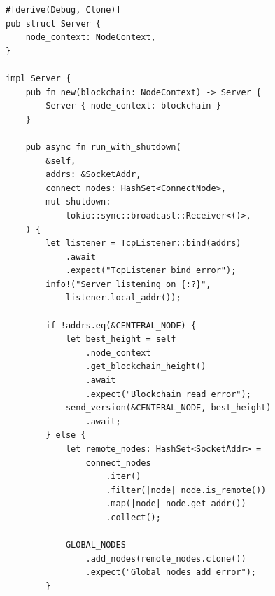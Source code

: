 \begin{listing}[htbp]
\caption{TCP server setup and bootstrap}
\label{lst:ch12-server-setup}
\begin{verbatim}
#[derive(Debug, Clone)]
pub struct Server {
    node_context: NodeContext,
}

impl Server {
    pub fn new(blockchain: NodeContext) -> Server {
        Server { node_context: blockchain }
    }

    pub async fn run_with_shutdown(
        &self,
        addrs: &SocketAddr,
        connect_nodes: HashSet<ConnectNode>,
        mut shutdown:
            tokio::sync::broadcast::Receiver<()>,
    ) {
        let listener = TcpListener::bind(addrs)
            .await
            .expect("TcpListener bind error");
        info!("Server listening on {:?}",
            listener.local_addr());

        if !addrs.eq(&CENTERAL_NODE) {
            let best_height = self
                .node_context
                .get_blockchain_height()
                .await
                .expect("Blockchain read error");
            send_version(&CENTERAL_NODE, best_height)
                .await;
        } else {
            let remote_nodes: HashSet<SocketAddr> =
                connect_nodes
                    .iter()
                    .filter(|node| node.is_remote())
                    .map(|node| node.get_addr())
                    .collect();

            GLOBAL_NODES
                .add_nodes(remote_nodes.clone())
                .expect("Global nodes add error");
        }


\end{verbatim}
\end{listing}
